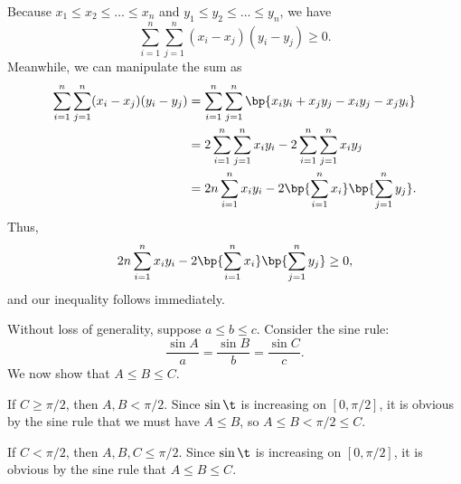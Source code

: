 \begin{solution}
    \begin{ppart}
        Because $x_1 \leq x_2 \leq \dots \leq x_n$ and $y_1 \leq y_2 \leq \dots \leq y_n$, we have \[\sum_{i = 1}^n \sum_{j = 1}^n (x_i - x_j)(y_i - y_j) \geq 0.\] Meanwhile, we can manipulate the sum as
        \begin{align*}
            \sum_{i = 1}^n \sum_{j = 1}^n (x_i - x_j)(y_i - y_j) &= \sum_{i = 1}^n \sum_{j = 1}^n \bp{x_i y_i + x_j y_j - x_i y_j - x_j y_i}\\
            &= 2\sum_{i = 1}^n \sum_{j = 1}^n x_i y_i - 2\sum_{i = 1}^n \sum_{j = 1}^n x_i y_j\\
            &= 2n \sum_{i = 1}^n x_i y_i - 2\bp{\sum_{i = 1}^n x_i}\bp{\sum_{j = 1}^n y_j}.
        \end{align*}
        Thus, \[2n \sum_{i = 1}^n x_i y_i - 2\bp{\sum_{i = 1}^n x_i}\bp{\sum_{j = 1}^n y_j} \geq 0,\] and our inequality follows immediately.
    \end{ppart}
    \begin{ppart}
        Without loss of generality, suppose $a \leq b \leq c$. Consider the sine rule: \[\frac{\sin A}{a} = \frac{\sin B}{b} = \frac{\sin C}{c}.\] We now show that $A \leq B \leq C$.

         If $C \geq \pi/2$, then $A, B < \pi/2$. Since $\sin \t$ is increasing on $[0, \pi/2]$, it is obvious by the sine rule that we must have $A \leq B$, so $A \leq B < \pi/2 \leq C$.

         If $C < \pi/2$, then $A, B, C \leq \pi/2$. Since $\sin \t$ is increasing on $[0, \pi/2]$, it is obvious by the sine rule that $A \leq B \leq C$.


\end{ppart}
\end{solution}
